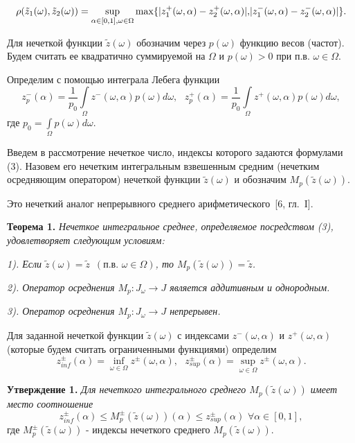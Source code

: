 \begin{equation*}
\rho(\tilde{z}_1(\omega), \tilde{z}_2(\omega)) = \sup\limits_{\alpha\in[0,1], \omega\in\Omega}\max\{|z_1^{+}(\omega, \alpha) - z_2^{+}(\omega, \alpha)|, $$$$|z_1^{-}(\omega, \alpha) - z_2^{-}(\omega, \alpha)|\}.
\end{equation*}




Для нечеткой функции $\tilde{z}(\omega)$ обозначим через $p(\omega)$ функцию весов (частот).  Будем считать ее квадратично суммируемой на $\Omega$ и $p(\omega)>0$ при п.в. $\omega\in\Omega$.

Определим с помощью интеграла Лебега функции
\begin{equation}
z^{-}_{p}(\alpha) = \frac{1}{p_0}\int\limits_{\Omega}z^{-}(\omega, \alpha)p(\omega)d\omega,\,\,\,\,z^{+}_{p}(\alpha) = \frac{1}{p_0}\int\limits_{\Omega}z^{+}(\omega, \alpha)p(\omega)d\omega,
\end{equation}
где $p_0 = \int\limits_{\Omega}p(\omega)d\omega$.


Введем в рассмотрение нечеткое число, индексы которого задаются формулами (3). Назовем его нечетким интегральным взвешенным средним (нечетким осредняющим оператором) нечеткой функции $\tilde{z}(\omega)$ и обозначим $M_p(\tilde{z}(\omega))$.

Это нечеткий аналог непрерывного среднего арифметического~[6, гл.~{I}].


\textbf{Теорема 1.} \textit{Нечеткое интегральное среднее, определяемое посредством (3), удовлетворяет следующим условиям:}

\textit{1). Если $\tilde{z}(\omega) = \tilde{z}\,\,\,(\text{п.в.}\,\,\omega\in\Omega)$, то $M_p(\tilde{z}(\omega)) = \tilde{z}$.
}

\textit{2). Оператор осреднения $M_p: J_{\omega}\rightarrow J$ является аддитивным и однородным.
}

\textit{3). Оператор осреднения $M_p: J_{\omega}\rightarrow J$ непрерывен.
}


Для заданной нечеткой функции $\tilde{z}(\omega)$ с индексами $z^{-}(\omega, \alpha)$ и $z^{+}(\omega, \alpha)$ (которые будем считать ограниченными функциями) определим
$$
z_{inf}^{\pm}(\alpha)=\inf\limits_{\omega\in\Omega}z^{\pm}(\omega, \alpha),\,\,\,\,z_{sup}^{\pm}(\alpha)=\sup\limits_{\omega\in\Omega}z^{\pm}(\omega, \alpha).
$$

\textbf{Утверждение 1.} \textit{Для нечеткого интегрального среднего $M_p(\tilde{z}(\omega))$ имеет место соотношение }
$$
z_{inf}^{\pm}(\alpha)\leq M_p^{\pm}(\tilde{z}(\omega))(\alpha) \leq z_{sup}^{\pm}(\alpha)\,\,\forall\alpha\in[0, 1],
$$
где $M_p^{\pm}(\tilde{z}(\omega))$ - индексы нечеткого среднего $M_p(\tilde{z}(\omega))$.



